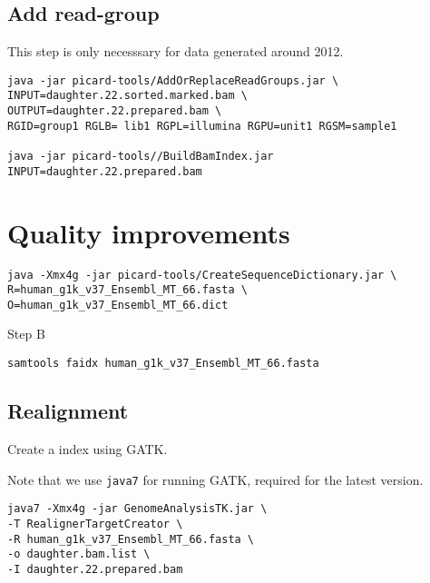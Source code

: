 \documentclass{article}
\begin{document}
\subsection{Add read-group}

This step is only necesssary for data generated around 2012.

\begin{verbatim}
java -jar picard-tools/AddOrReplaceReadGroups.jar \
INPUT=daughter.22.sorted.marked.bam \
OUTPUT=daughter.22.prepared.bam \
RGID=group1 RGLB= lib1 RGPL=illumina RGPU=unit1 RGSM=sample1

java -jar picard-tools//BuildBamIndex.jar INPUT=daughter.22.prepared.bam
\end{verbatim}

\section{Quality improvements}


\begin{verbatim}
java -Xmx4g -jar picard-tools/CreateSequenceDictionary.jar \
R=human_g1k_v37_Ensembl_MT_66.fasta \
O=human_g1k_v37_Ensembl_MT_66.dict
\end{verbatim}           
Step B 
\begin{verbatim}
samtools faidx human_g1k_v37_Ensembl_MT_66.fasta
\end{verbatim}

\subsection{Realignment}
Create a index using GATK. 

Note that we use \verb+java7+ for running GATK, required for the latest version.

\begin{verbatim}
java7 -Xmx4g -jar GenomeAnalysisTK.jar \
-T RealignerTargetCreator \
-R human_g1k_v37_Ensembl_MT_66.fasta \
-o daughter.bam.list \
-I daughter.22.prepared.bam 
\end{verbatim}
\end{document}

